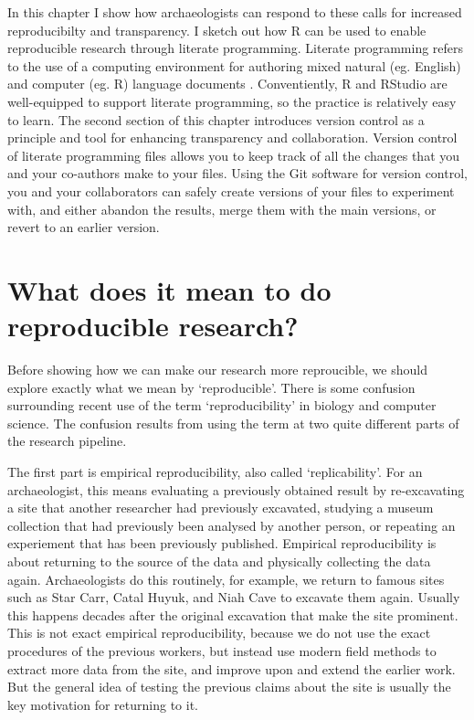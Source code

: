 \documentclass[]{book}
\begin{document}
In this chapter I show how archaeologists can respond to these calls for
increased reproducibilty and transparency. I sketch out how R can be
used to enable reproducible research through literate programming.
Literate programming refers to the use of a computing environment for
authoring mixed natural (eg. English) and computer (eg. R) language
documents \citep{Schulte2012literate}. Conventiently, R and RStudio are
well-equipped to support literate programming, so the practice is
relatively easy to learn. The second section of this chapter introduces
version control as a principle and tool for enhancing transparency and
collaboration. Version control of literate programming files allows you
to keep track of all the changes that you and your co-authors make to
your files. Using the Git software for version control, you and your
collaborators can safely create versions of your files to experiment
with, and either abandon the results, merge them with the main versions,
or revert to an earlier version.

\section{What does it mean to do reproducible
research?}\label{what-does-it-mean-to-do-reproducible-research}

Before showing how we can make our research more reproucible, we should
explore exactly what we mean by `reproducible'. There is some confusion
surrounding recent use of the term `reproducibility' in biology and
computer science. The confusion results from using the term at two quite
different parts of the research pipeline.

The first part is empirical reproducibility, also called
`replicability'. For an archaeologist, this means evaluating a
previously obtained result by re-excavating a site that another
researcher had previously excavated, studying a museum collection that
had previously been analysed by another person, or repeating an
experiement that has been previously published. Empirical
reproducibility is about returning to the source of the data and
physically collecting the data again. Archaeologists do this routinely,
for example, we return to famous sites such as Star Carr, Catal Huyuk,
and Niah Cave to excavate them again. Usually this happens decades after
the original excavation that make the site prominent. This is not exact
empirical reproducibility, because we do not use the exact procedures of
the previous workers, but instead use modern field methods to extract
more data from the site, and improve upon and extend the earlier work.
But the general idea of testing the previous claims about the site is
usually the key motivation for returning to it.
\end{document}
